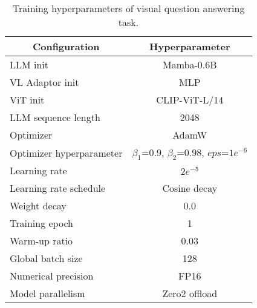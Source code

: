 
\begin{table}[]
\centering
\scalebox{0.9}
{
\begin{tabular}{l|c}
\toprule
\multicolumn{1}{c|}{Configuration} & Hyperparameter                         \\ \midrule
LLM init                           & Mamba-0.6B              \\
VL Adaptor init                    & MLP                     \\
ViT init                           & CLIP-ViT-L/14           \\
LLM sequence length                & 2048                    \\
Optimizer                          & AdamW                   \\
Optimizer hyperparameter           & $\beta_1$=0.9, $\beta_2$=0.98, $eps$=$1e^{-6}$ \\
Learning rate                      & $2e^{-5}$                    \\
Learning rate schedule             & Cosine decay            \\
Weight decay                       & 0.0                     \\
Training epoch                     & 1                       \\
Warm-up ratio                      & 0.03                    \\
Global batch size                  & 128                     \\
Numerical precision                & FP16                    \\
Model parallelism                  & Zero2 offload           \\ \midrule
\end{tabular}}
\caption{
Training hyperparameters of visual question answering task.
}
\label{tab:aba_hyper}
\end{table}